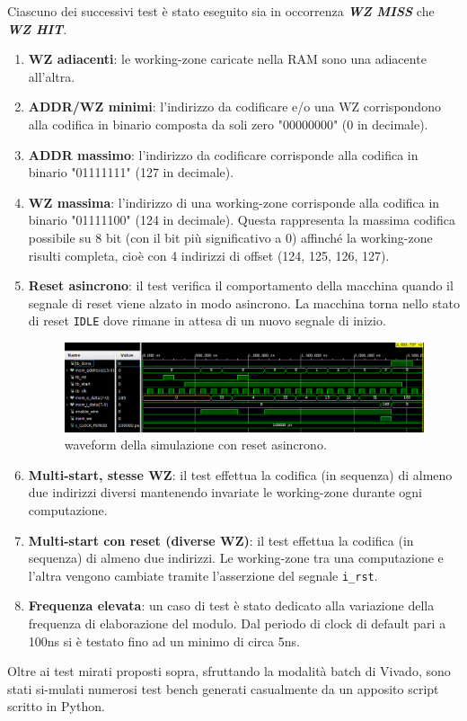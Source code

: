 Ciascuno dei successivi test è stato eseguito sia in occorrenza \textit{\textbf{WZ MISS}} che \textit{\textbf{WZ HIT}}.

\begin{enumerate}[resume]
	
	\item \textbf{WZ adiacenti}: le working-zone caricate nella RAM sono una adiacente all'altra.
	
	\item \textbf{ADDR/WZ minimi}: l'indirizzo da codificare e/o una WZ corrispondono alla codifica in binario composta da soli zero "00000000" (0 in decimale).
	
	\item \textbf{ADDR massimo}: l'indirizzo da codificare corrisponde alla codifica in binario "01111111" (127 in decimale).
	
	\item \textbf{WZ massima}: l'indirizzo di una working-zone corrisponde alla codifica in binario "01111100" (124 in decimale). Questa rappresenta la massima codifica possibile su 8 bit (con il bit più significativo a 0) affinché la working-zone risulti completa, cioè con 4 indirizzi di offset (124, 125, 126, 127).

	\item \textbf{Reset asincrono}: il test verifica il comportamento della macchina quando il segnale di reset viene alzato in modo asincrono. La macchina torna nello stato di reset \texttt{IDLE} dove rimane in attesa di un nuovo segnale di inizio.
	\begin{figure}[!htb]
		\centering
		\includegraphics[scale=0.520]{images/async_reset.png}
		\caption{waveform della simulazione con reset asincrono.}	
	\end{figure}
	
	\item \textbf{Multi-start, stesse WZ}: il test effettua la codifica (in sequenza) di almeno due indirizzi diversi mantenendo invariate le working-zone durante ogni computazione.
	
	\item \textbf{Multi-start con reset (diverse WZ)}: il test effettua la codifica (in sequenza) di almeno due indirizzi. Le working-zone tra una computazione e l'altra vengono cambiate tramite l'asserzione del segnale \lstinline[columns=fixed]{i_rst}.
	
	\item \textbf{Frequenza elevata}: un caso di test è stato dedicato alla variazione della frequenza di elaborazione del modulo. Dal periodo di clock di default pari a 100ns si è testato fino ad un minimo di circa 5ns.
\end{enumerate}

Oltre ai test mirati proposti sopra, sfruttando la modalità batch di Vivado, sono stati si-mulati numerosi test bench generati casualmente da un apposito script scritto in Python.\newline
